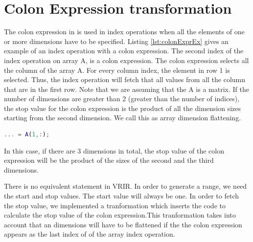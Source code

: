 \section{Colon Expression transformation}
\label{sec:colonExpr}
The colon expression in \matlab is used in index operations when all the elements of one or more dimensions have to be specified. Listing \ref{lst:colonExprEx} gives an example of an index operation with a colon expression. The second index of the index operation on array A, is a colon expression. The colon expression selects all the column of the array A. For every column index, the element in row 1 is selected. Thus, the index operation will fetch that all values from all the column that are in the first row. Note that we are assuming that the A is a matrix. If the number of dimensions are greater than 2 (greater than the number of indices), the stop value for the colon expression is the product of all the dimension sizes starting from the second dimension. We call this as array dimension flattening. 
\begin{lstlisting}[language=matlab, label={lst:colonExprEx}, caption={An example of the an array index operation with a colon expression as an index. }]
... = A(1,:);
\end{lstlisting}
In this case, if there are 3 dimensions in total, the stop value of the colon expression will be the product of the sizes of the second and the third dimensions. 

There is no equivalent statement in VRIR. In order to generate a range, we need the start and stop values. The start value will always be one. In order to fetch the stop value, we implemented a tranformation which inserts the code to calculate the stop value of the colon expression.This tranformation takes into account that an dimensions will have to be flattened if the the colon expression appears as the last index of of the array index operation. 

